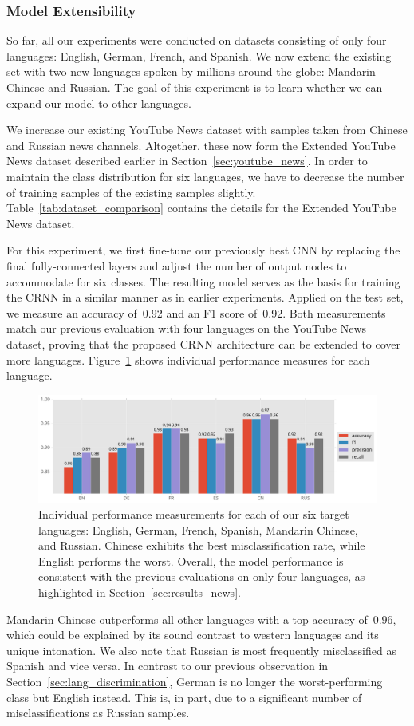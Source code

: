 \subsubsection{Model Extensibility}
\label{sec:extensibility}
So far, all our experiments were conducted on datasets consisting of only four languages: English, German, French, and Spanish. We now extend the existing set with two new languages spoken by millions around the globe: Mandarin Chinese and Russian. The goal of this experiment is to learn whether we can expand our model to other languages.

We increase our existing YouTube News dataset with samples taken from Chinese and Russian news channels. Altogether, these now form the Extended YouTube News dataset described earlier in Section~\ref{sec:youtube_news}. In order to maintain the class distribution for six languages, we have to decrease the number of training samples of the existing samples slightly. Table~\ref{tab:dataset_comparison} contains the details for the Extended YouTube News dataset.

For this experiment, we first fine-tune our previously best CNN by replacing the final fully-connected layers and adjust the number of output nodes to accommodate for six classes. The resulting model serves as the basis for training the CRNN in a similar manner as in earlier experiments. Applied on the test set, we measure an accuracy of~\num{0.92} and an F1 score of~\num{0.92}. Both measurements match our previous evaluation with four languages on the YouTube News dataset, proving that the proposed CRNN architecture can be extended to cover more languages. Figure~\ref{fig:6lang} shows individual performance measures for each language.
%
	\begin{figure}[tp]
  		\centering
    	\includegraphics[width=\textwidth, keepaspectratio]{plots/results_6lang_plot.pdf}
    	\caption{Individual performance measurements for each of our six target languages: English, German, French, Spanish, Mandarin Chinese, and Russian. Chinese exhibits the best misclassification rate, while English performs the worst. Overall, the model performance is consistent with the previous evaluations on only four languages, as highlighted in Section~\ref{sec:results_news}.}
    	\label{fig:6lang}
	\end{figure}
%
Mandarin Chinese outperforms all other languages with a top accuracy of~\num{0.96}, which could be explained by its sound contrast to western languages and its unique intonation. We also note that Russian is most frequently misclassified as Spanish and vice versa. In contrast to our previous observation in Section~\ref{sec:lang_discrimination}, German is no longer the worst-performing class but English instead. This is, in part, due to a significant number of misclassifications as Russian samples.


